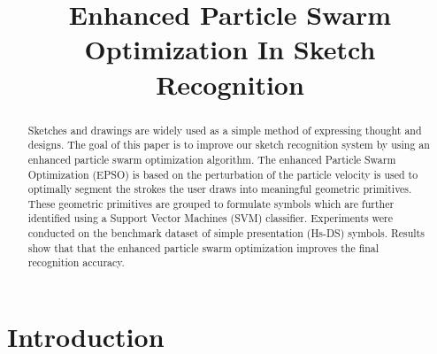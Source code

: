 \documentclass[10pt]{article}
\title{Enhanced Particle Swarm Optimization In Sketch Recognition}
\begin{document}
\maketitle
 \begin{abstract}

Sketches and drawings are widely used as a simple method of expressing thought and designs. The goal of this paper is to improve our sketch recognition system by using an enhanced particle swarm optimization algorithm. The enhanced Particle Swarm Optimization (EPSO) is based on the perturbation of the particle velocity is used to optimally segment the strokes the user draws into meaningful geometric primitives.  These geometric primitives are grouped to formulate symbols which are further identified using a Support Vector Machines (SVM) classifier. Experiments were conducted on the benchmark dataset of simple presentation (Hs-DS) symbols. Results show that that the enhanced particle swarm optimization improves the final recognition accuracy. 

\end{abstract}
 \section{Introduction}
\end{document}
